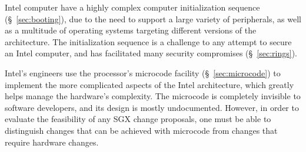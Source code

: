 Intel computer have a highly complex computer initialization sequence
(\S~\ref{sec:booting}), due to the need to support a large variety of
peripherals, as well as a multitude of operating systems targeting different
versions of the architecture. The initialization sequence is a challenge to any
attempt to secure an Intel computer, and has facilitated many security
compromises (\S~\ref{sec:rings}).

Intel's engineers use the processor's microcode facility
(\S~\ref{sec:microcode}) to implement the more complicated aspects of the Intel
architecture, which greatly helps manage the hardware's complexity. The
microcode is completely invisible to software developers, and its design is
mostly undocumented. However, in order to evaluate the feasibility of any SGX
change proposals, one must be able to distinguish changes that can be achieved
with microcode from changes that require hardware changes.
